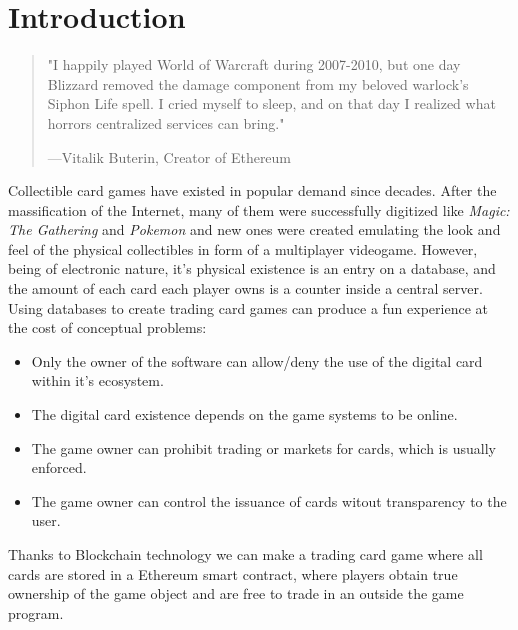 \documentclass[11pt,twocolumn]{article}
\begin{document}
\maketitle
\pagebreak

\pagebreak
\twocolumn
\section{Introduction}
\begin{quote}"I happily played World of Warcraft during 2007-2010, but one day Blizzard removed the damage component from my beloved warlock's Siphon Life spell. I cried myself to sleep, and on that day I realized what horrors centralized services can bring."
        \begin{flushright}
                {---Vitalik Buterin, Creator of Ethereum}
              \end{flushright}
        \end{quote}

Collectible card games have existed in popular demand since decades. After the massification of the Internet, many of them were successfully digitized like \textit{Magic: The Gathering} and \textit{Pokemon} and new ones were created emulating the look and feel of the physical collectibles in form of a multiplayer videogame.
However, being of electronic nature, it's physical existence is an entry on a database, and the amount of each card each player owns is a counter inside a central server. Using databases to create trading card games can produce a fun experience at the cost of conceptual problems:

\begin{itemize}
        \item Only the owner of the software can allow/deny the use of the digital card within it's ecosystem.
        \item The digital card existence depends on the game systems to be online.
        \item The game owner can prohibit trading or markets for cards, which is usually enforced.
        \item The game owner can control the issuance of cards witout transparency to the user.
\end{itemize}

Thanks to Blockchain technology we can make a trading card game where all cards are stored in a Ethereum smart contract, where players obtain true ownership of the game object and are free to trade in an outside the game program.\\
\end{document}
